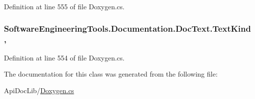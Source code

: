 Definition at line 555 of file Doxygen.\+cs.

\hypertarget{class_software_engineering_tools_1_1_documentation_1_1_doc_text_a048129017e00ecdf66e0e9a698a45638}{
\subsubsection[{Text\+Kind}]{ Software\+Engineering\+Tools.\+Documentation.\+Doc\+Text.\+Text\+Kind\hspace{0.3cm}{\ttfamily [get]}, {\ttfamily [set]}}}\label{class_software_engineering_tools_1_1_documentation_1_1_doc_text_a048129017e00ecdf66e0e9a698a45638}


Definition at line 554 of file Doxygen.\+cs.



The documentation for this class was generated from the following file\+:\begin{DoxyCompactItemize}
\item 
Api\+Doc\+Lib/\hyperlink{_doxygen_8cs}{Doxygen.\+cs}\end{DoxyCompactItemize}
